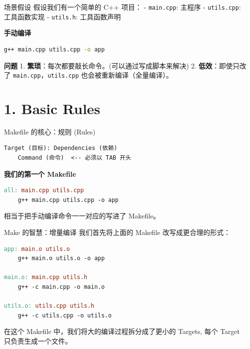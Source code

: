 \documentclass[aspectratio=169,10pt]{beamer}
\begin{document}
\begin{frame}[fragile,shrink=12]{场景假设}
\footnotesize
假设我们有一个简单的 C++ 项目： - \texttt{main.cpp}: 主程序 - \texttt{utils.cpp}: 工具函数实现 - \texttt{utils.h}: 工具函数声明

\textbf{手动编译}

\begin{lstlisting}[language=bash]
g++ main.cpp utils.cpp -o app
\end{lstlisting}

\textbf{问题} 1. \textbf{繁琐}：每次都要敲长命令。(可以通过写成脚本来解决) 2. \textbf{低效}：即使只改了 \texttt{main.cpp}，\texttt{utils.cpp} 也会被重新编译（全量编译）。
\end{frame}

\section{1. Basic Rules}

\begin{frame}[fragile,shrink=12]{Makefile 的核心：规则 (Rules)}
\footnotesize
\begin{lstlisting}
Target (目标): Dependencies (依赖)
    Command (命令)  <-- 必须以 TAB 开头
\end{lstlisting}

\textbf{我们的第一个 Makefile}

\begin{lstlisting}[language=make]
all: main.cpp utils.cpp
    g++ main.cpp utils.cpp -o app
\end{lstlisting}

相当于把手动编译命令一一对应的写进了 Makefile。
\end{frame}

\begin{frame}[fragile,shrink=12]{Make 的智慧：增量编译}
\footnotesize
我们首先将上面的 Makefile 改写成更合理的形式：

\begin{lstlisting}[language=make]
app: main.o utils.o
    g++ main.o utils.o -o app

main.o: main.cpp utils.h
    g++ -c main.cpp -o main.o

utils.o: utils.cpp utils.h
    g++ -c utils.cpp -o utils.o
\end{lstlisting}

在这个 Makefile 中，我们将大的编译过程拆分成了更小的 Targets, 每个 Target 只负责生成一个文件。
\end{frame}
\end{document}
